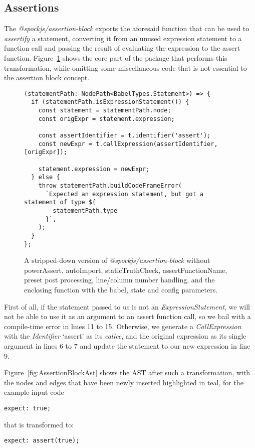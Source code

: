 

\subsection{Assertions}
The \textit{@spockjs/assertion-block} exports the aforesaid function
that can be used to \textit{assertify} a statement,
converting it from an unused expression statement to a function call and
passing the result of evaluating the expression to the assert function.
Figure~\ref{fig:AssertionBlockCore} shows the core part of the package
that performs this transformation,
while omitting some miscellaneous code that is
not essential to the assertion block concept.

\begin{figure}
  \begin{verbatim}
(statementPath: NodePath<BabelTypes.Statement>) => {
  if (statementPath.isExpressionStatement()) {
    const statement = statementPath.node;
    const origExpr = statement.expression;

    const assertIdentifier = t.identifier('assert');
    const newExpr = t.callExpression(assertIdentifier, [origExpr]);

    statement.expression = newExpr;
  } else {
    throw statementPath.buildCodeFrameError(
      `Expected an expression statement, but got a statement of type ${
        statementPath.type
      }`,
    );
  }
};
  \end{verbatim}
  \caption{
    A stripped-down version of \textit{@spockjs/assertion-block}
    without powerAssert, autoImport, staticTruthCheck, assertFunctionName,
    preset post processing, line/column number handling, and
    the enclosing function with the babel, state and config parameters.
  }\label{fig:AssertionBlockCore}
\end{figure}

First of all, if the statement passed to us is not an \textit{ExpressionStatement},
we will not be able to use it as an argument to an assert function call,
so we bail with a compile-time error in lines 11 to 15.
Otherwise, we generate a \textit{CallExpression}
with the \textit{Identifier} `assert' as its \textit{callee},
and the original expression as its single argument in lines 6 to 7
and update the statement to our new expression in line 9.

Figure~\ref{fig:AssertionBlockAst} shows the AST after such a transformation,
with the nodes and edges that have been newly inserted highlighted in teal,
for the example input code
\begin{verbatim}
expect: true;
\end{verbatim}
that is transformed to:
\begin{verbatim}
expect: assert(true);
\end{verbatim}

